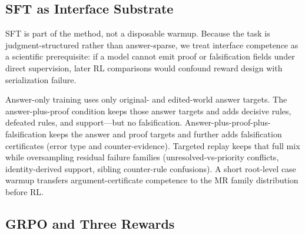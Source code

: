 \documentclass[letterpaper]{article}
\begin{document}
\subsection{SFT as Interface Substrate}

SFT is part of the method, not a disposable warmup. Because the task is judgment-structured rather than answer-sparse, we treat interface competence as a scientific prerequisite: if a model cannot emit proof or falsification fields under direct supervision, later RL comparisons would confound reward design with serialization failure.

Answer-only training uses only original- and edited-world answer targets. The answer-plus-proof condition keeps those answer targets and adds decisive rules, defeated rules, and support---but no falsification. Answer-plus-proof-plus-falsification keeps the answer and proof targets and further adds falsification certificates (error type and counter-evidence). Targeted replay keeps that full mix while oversampling residual failure families (unresolved-vs-priority conflicts, identity-derived support, sibling counter-rule confusions). A short root-level case warmup transfers argument-certificate competence to the MR family distribution before RL.

\subsection{GRPO and Three Rewards}
\end{document}
